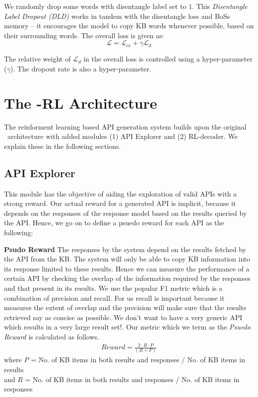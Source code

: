 We randomly drop some words with disentangle label set to $1$. This \textit{Disentangle Label Dropout (DLD)} works in tandem with the disentangle loss and {\sc BoSs} memory -- it encourages the model to copy KB words whenever possible, based on their surrounding words. The overall loss is given as:
\begin{equation}
\mathcal{L} = \mathcal{L}_{ce} + \gamma \mathcal{L}_{d}
\label{eqn:loss}
\end{equation}

The relative weight of $\mathcal{L}_{d}$ in the overall loss is controlled using a hyper-parameter ($\gamma$). The dropout rate is also a hyper-parameter.

\section{The \sys -RL Architecture}
The reinforment learning based API generation system builds upon the original \sys\ architecture with added modules (1) API Explorer and (2) RL-decoder. We explain these in the following sections.

\subsection{API Explorer}
This module has the objective of aiding the exploration of valid APIs with a strong reward. Our actual reward for a generated API is implicit, because it depends on the responses of the response model based on the results queried by the API. Hence, we go on to define a psuedo reward for each API as the following:

\noindent\textbf{Psudo Reward}
\label{ssec:PsReward}
The responses by the system depend on the results fetched by the API from the KB. The system will only be able to copy KB information into its response limited to these results. Hence we can measure the performance of a certain API by checking the overlap of the information required by the responses and that present in its results. We use the popular F1 metric which is a combination of precision and recall. For us recall is important because it measures the extent of overlap and the precision will make sure that the results retrieved say as concise as possible. We don't want to have a very generic API which results in a very large result set!. Our metric which we term as the {\em Psuedo Reward} is calculated as follows.
\begin{gather}
Reward = \frac{2 \cdot R \cdot P}{(R + P)}
\end{gather}
where $P$ = No. of KB items in both results and responses / No. of KB items in results \\ and $R$ = No. of KB items in both results and responses / No. of KB items in responses

